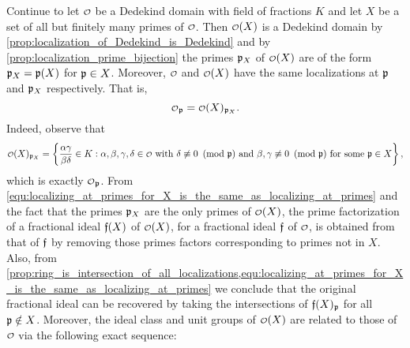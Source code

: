     Continue to let $\smc{O}$ be a Dedekind domain with field of fractions $K$ and let $X$ be a set of all but finitely many primes of $\smc{O}$. Then $\smc{O}(X)$ is a Dedekind domain by \cref{prop:localization_of_Dedekind_is_Dedekind} and by \cref{prop:localization_prime_bijection} the primes $\mathfrak{p}_{X}$ of $\smc{O}(X)$ are of the form $\mathfrak{p}_{X} = \mathfrak{p}(X)$ for $\mathfrak{p} \in X$. Moreover, $\smc{O}$ and $\smc{O}(X)$ have the same localizations at $\mathfrak{p}$ and $\mathfrak{p}_{X}$ respectively. That is,
    \begin{equation}\label{equ:localizing_at_primes_for_X_is_the_same_as_localizing_at_primes}
      \smc{O}_{\mf{p}} = \smc{O}(X)_{\mf{p}_{X}}.
    \end{equation}
    Indeed, observe that
     \[
      \smc{O}(X)_{\mf{p}_{X}} = \left\{\frac{\a\g}{\b\d} \in K:\text{$\a,\b,\g,\d \in \smc{O}$ with $\d \not\equiv 0 \tmod{\mf{p}}$ and $\b,\g \not\equiv 0 \tmod{\mf{p}}$ for some $\mf{p} \in X$}\right\},
     \]
     which is exactly $\smc{O}_{\mf{p}}$. From \cref{equ:localizing_at_primes_for_X_is_the_same_as_localizing_at_primes} and the fact that the primes $\mathfrak{p}_{X}$ are the only primes of $\smc{O}(X)$, the prime factorization of a fractional ideal $\mathfrak{f}(X)$ of $\smc{O}(X)$, for a fractional ideal $\mathfrak{f}$ of $\smc{O}$, is obtained from that of $\mathfrak{f}$ by removing those primes factors corresponding to primes not in $X$. Also, from \cref{prop:ring_is_intersection_of_all_localizations,equ:localizing_at_primes_for_X_is_the_same_as_localizing_at_primes} we conclude that the original fractional ideal can be recovered by taking the intersections of $\mathfrak{f}(X)_{\mathfrak{p}}$ for all $\mathfrak{p} \notin X$. Moreover, the ideal class and unit groups of $\smc{O}(X)$ are related to those of $\smc{O}$ via the following exact sequence:

